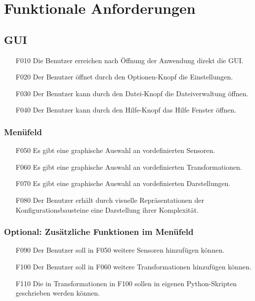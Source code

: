 \documentclass[parskip=full]{scrartcl}
\begin{document}
\section{Funktionale Anforderungen}\label{funktionale}


\subsection{GUI} %

\begin{itemize}
\item[F010] Die Benutzer erreichen nach Öffnung der Anwendung direkt die \gls{GUI}.
\item[F020] Der Benutzer öffnet durch den Optionen-Knopf die Einstellungen.
\item[F030] Der Benutzer kann durch den Datei-Knopf die Dateiverwaltung öffnen.
\item[F040] Der Benutzer kann durch den Hilfe-Knopf das Hilfe Fenster öffnen.
\end{itemize}

\subsubsection{Menüfeld}

\begin{itemize}
\item[F050] Es gibt eine graphische Auswahl an vordefinierten Sensoren.
\item[F060] Es gibt eine graphische Auswahl an vordefinierten Transformationen.
\item[F070] Es gibt eine graphische Auswahl an vordefinierten Darstellungen.
\item[F080] Der Benutzer erhält durch visuelle Repräsentationen der Konfigurationsbausteine eine Darstellung ihrer Komplexität.
\end{itemize}

\subsubsection{Optional: Zusätzliche Funktionen im Menüfeld}

\begin{itemize}

\item[F090] Der Benutzer soll in F050 weitere Sensoren hinzufügen können.
\item[F100] Der Benutzer soll in F060 weitere Transformationen hinzufügen können.
\item[F110] Die in Transformationen in F100 sollen in eigenen Python-Skripten geschrieben werden können.
\end{itemize}
\end{document}

